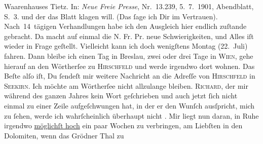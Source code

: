\begin{ledgroupsized}[t]{13cm}
{{{{                        Waarenhauses Tietz}. In: \emph{Neue Freie
                        Presse}, Nr. 13.239, 5. 7. 1901,
                     Abendblatt, S. 3.}}}\label{K_L03073-1h} und der das Blatt klagen will. (Das ſage ich Dir im Vertrauen).
               Nach 14 tägigen Verhandlungen habe ich den Ausgleich hier endlich zuſtande gebracht.
               Da macht auf einmal die N. Fr. Pr. neue
               Schwierigkeiten, und Alles iſt {\pb}wieder in Frage
               geſtellt.\pend
           \pstart
           Vielleicht kann ich doch wenigſtens Montag (22. Juli)
               fahren. Dann bleibe ich einen Tag in Breslau,
               zwei oder drei Tage in \textsc{Wien}, gehe hierauf an den Wörtherſee zu \textsc{Hirschfeld} und werde irgendwo dort wohnen. Das Beſte alſo iſt, Du ſendeſt mir weitere
               Nachricht an die Adreſſe von \textsc{Hirschfeld} in \textsc{Seekirn}. Ich möchte am Wörtherſee nicht allzulange
               bleiben. \textsc{Richard}, der mir während des ganzen Jahres kein Wort geſchrieben und auch jetzt ſich
               nicht einmal zu einer Zeile {\pb}aufgeſchwungen hat, in
               der er den Wunſch ausſpricht, mich zu ſehen, werde ich wahrſcheinlich überhaupt nicht
                  \label{K_L03073-2v}\label{K_L03073-2h}.\pend
           \pstart
           Mir liegt nun daran, in Ruhe irgendwo \uline{möglichſt hoch}
               ein paar Wochen zu verbringen, am Liebſten in den Dolomiten, wenn das Grödner Thal zu

\end{ledgroupsized}
